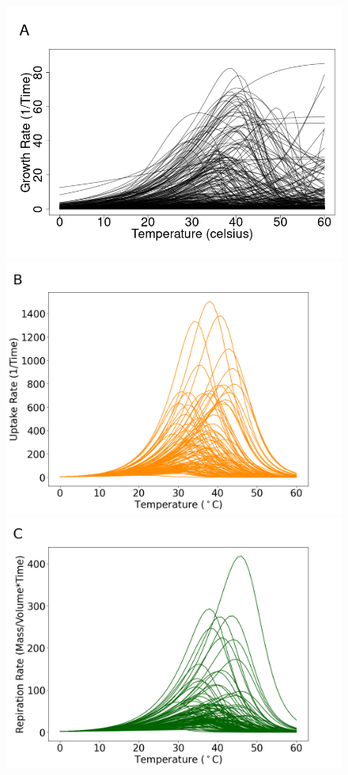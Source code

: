 \begin{figure}[H]
    \centering
    \includegraphics[scale=0.3]{./Figures/BioTrait_growth.png} \\
    \includegraphics[scale=0.27]{./Figures/simulated_uptake_rate.png}
    \includegraphics[scale=0.27]{./Figures/simulated_res_rate.png}

\end{figure}
